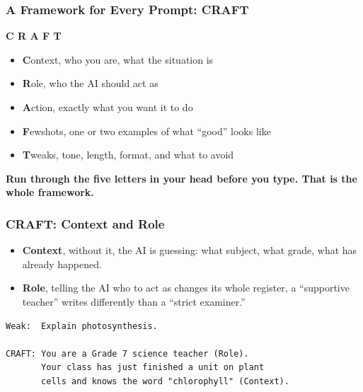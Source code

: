 \begin{frame}[fragile]\frametitle{A Framework for Every Prompt: CRAFT}

\begin{center}
\Large \textbf{C R A F T}
\end{center}

\medskip
\begin{itemize}
    \item \textbf{C}ontext, who you are, what the situation is
    \item \textbf{R}ole, who the AI should act as
    \item \textbf{A}ction, exactly what you want it to do
    \item \textbf{F}ewshots, one or two examples of what ``good'' looks like
    \item \textbf{T}weaks, tone, length, format, and what to avoid
\end{itemize}

\medskip
\begin{center}
\textbf{Run through the five letters in your head before you type. That is the whole framework.}
\end{center}

\end{frame}

\begin{frame}[fragile]\frametitle{CRAFT: Context and Role}

\begin{itemize}
    \item \textbf{Context}, without it, the AI is guessing: what subject, what grade, what has already happened.
    \item \textbf{Role}, telling the AI who to act as changes its whole register, a ``supportive teacher'' writes differently than a ``strict examiner.''
\end{itemize}

\begin{lstlisting}[language=HTML]
Weak:  Explain photosynthesis.

CRAFT: You are a Grade 7 science teacher (Role).
       Your class has just finished a unit on plant
       cells and knows the word "chlorophyll" (Context).
\end{lstlisting}

\end{frame}

